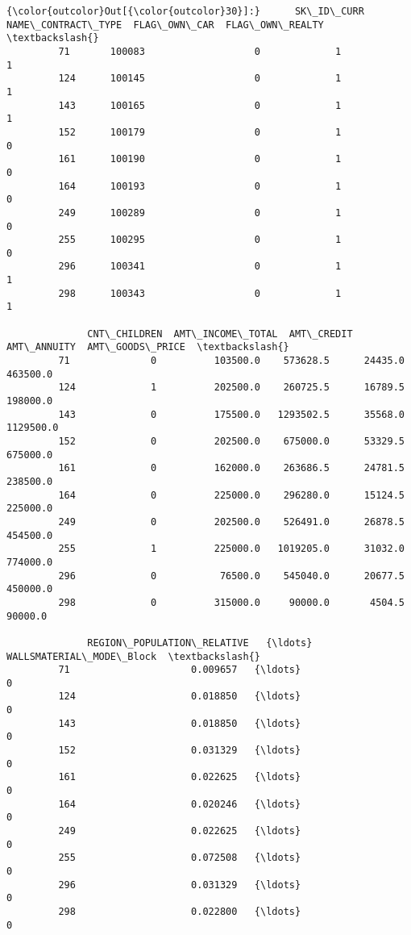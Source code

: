 \documentclass[11pt]{article}
\begin{document}
\begin{Verbatim}[commandchars=\\\{\}]
{\color{outcolor}Out[{\color{outcolor}30}]:}      SK\_ID\_CURR  NAME\_CONTRACT\_TYPE  FLAG\_OWN\_CAR  FLAG\_OWN\_REALTY  \textbackslash{}
         71       100083                   0             1                1   
         124      100145                   0             1                1   
         143      100165                   0             1                1   
         152      100179                   0             1                0   
         161      100190                   0             1                0   
         164      100193                   0             1                0   
         249      100289                   0             1                0   
         255      100295                   0             1                0   
         296      100341                   0             1                1   
         298      100343                   0             1                1   
         
              CNT\_CHILDREN  AMT\_INCOME\_TOTAL  AMT\_CREDIT  AMT\_ANNUITY  AMT\_GOODS\_PRICE  \textbackslash{}
         71              0          103500.0    573628.5      24435.0         463500.0   
         124             1          202500.0    260725.5      16789.5         198000.0   
         143             0          175500.0   1293502.5      35568.0        1129500.0   
         152             0          202500.0    675000.0      53329.5         675000.0   
         161             0          162000.0    263686.5      24781.5         238500.0   
         164             0          225000.0    296280.0      15124.5         225000.0   
         249             0          202500.0    526491.0      26878.5         454500.0   
         255             1          225000.0   1019205.0      31032.0         774000.0   
         296             0           76500.0    545040.0      20677.5         450000.0   
         298             0          315000.0     90000.0       4504.5          90000.0   
         
              REGION\_POPULATION\_RELATIVE   {\ldots}    WALLSMATERIAL\_MODE\_Block  \textbackslash{}
         71                     0.009657   {\ldots}                           0   
         124                    0.018850   {\ldots}                           0   
         143                    0.018850   {\ldots}                           0   
         152                    0.031329   {\ldots}                           0   
         161                    0.022625   {\ldots}                           0   
         164                    0.020246   {\ldots}                           0   
         249                    0.022625   {\ldots}                           0   
         255                    0.072508   {\ldots}                           0   
         296                    0.031329   {\ldots}                           0   
         298                    0.022800   {\ldots}                           0   
         

\end{Verbatim}
\end{document}
